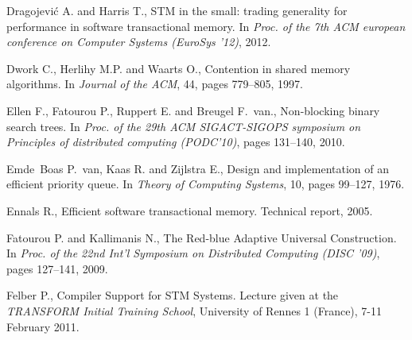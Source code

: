 \begin{thebibliography}{99}
{%

Dragojevi\'{c} A. and Harris T.,
\newblock STM in the small: trading generality for performance in software transactional memory.
\newblock In {\em Proc. of the 7th ACM european conference on Computer Systems (EuroSys '12)}, 2012.



Dwork C., Herlihy M.P. and Waarts O.,
\newblock Contention in shared memory algorithms.
\newblock In {\em Journal of the ACM}, 44, pages 779--805, 1997.


Ellen F., Fatourou P., Ruppert E. and Breugel F.~van.,
\newblock Non-blocking binary search trees.
\newblock In {\em Proc. of the 29th ACM SIGACT-SIGOPS symposium on
  Principles of distributed computing (PODC'10)}, pages 131--140, 2010.


Emde~Boas P.~van, Kaas R. and Zijlstra E.,
\newblock Design and implementation of an efficient priority queue.
\newblock In {\em Theory of Computing Systems}, 10, pages 99--127, 1976.




Ennals R.,
\newblock Efficient software transactional memory.
\newblock Technical report, 2005.






Fatourou P. and Kallimanis N., 
The Red-blue Adaptive Universal Construction. 
In {\it  Proc. of the 22nd  Int'l  Symposium on Distributed Computing
(DISC '09)}, pages 127--141,  2009. 



Felber P., 
Compiler Support for STM Systems. 
Lecture given at the  {\it TRANSFORM  Initial Training School},  University
of Rennes  1 (France), 7-11 February 2011. 






}
\end{thebibliography}
